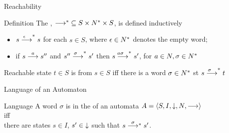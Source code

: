 \documentclass[aspectratio=169]{beamer}
\begin{document}
\begin{slide}{Reachability}
\small
\begin{block}{Definition}
The , ${\longrightarrow^*} \subseteq S \times N^* \times S$, is defined inductively
\begin{itemize}
\item $s \stackrel{\!\!\!\!\!\epsilon}{\longrightarrow}^* s$ for each $s \in S$, where $\epsilon \in N^*$ denotes the empty \alert{word};
\item if  $s \stackrel{a}{\longrightarrow} s''$  and $s'' \stackrel{\!\!\!\!\!\sigma}{\longrightarrow}^* s'$ then $s \stackrel{\!\!\!\!\!a \sigma}{\longrightarrow}^* s'$, for $a \in N, \sigma \in N^*$
\end{itemize}
\end{block}

\begin{block}{Reachable state}
$t \in S$ is  from $s \in S$ iff there is a \alert{word} $\sigma \in N^*$ st $s \stackrel{\!\!\!\!\!\sigma}{\longrightarrow}^* t$
\end{block}

\end{slide}

\begin{slide}{Language of an Automaton}
\small




\begin{block}{Language}
  \centering
  A word $\sigma$ is in the  of an automata $A = \mathopen{\langle}S,I,{\downarrow},N,\longrightarrow\mathclose{\rangle}$
  \\iff\\
  there are states $s\in I$, $s' \in {\downarrow}$ such that $s\rtrant{\sigma}s'$.
\end{block}
\end{slide}
\end{document}
